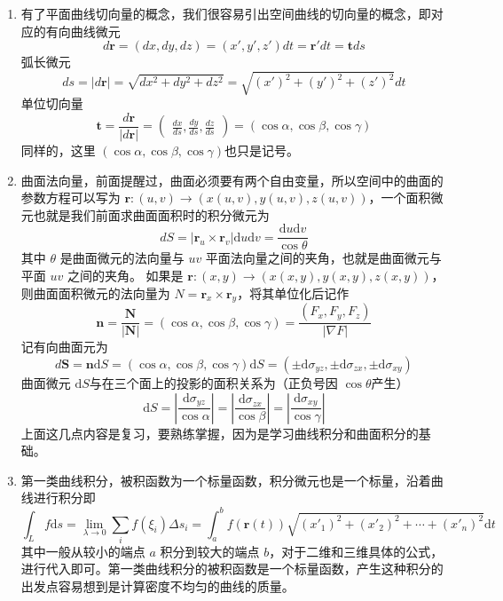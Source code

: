 \begin{enumerate}
    \item 有了平面曲线切向量的概念，我们很容易引出空间曲线的切向量的概念，即对应的有向曲线微元
    \[
        d\mathbf{r}=(dx,dy,dz)=(x',y',z')dt=\mathbf{r}'dt=\mathbf{t}ds
    \]
    弧长微元
    \[
        ds=|d\mathbf{r}|=\sqrt{dx^2+dy^2+dz^2}=\sqrt{(x')^2+(y')^2+(z')^2}dt
    \]
    单位切向量
    \[
    \mathbf{t}=\frac{d\mathbf{r}}{|d\mathbf{r}|}=\begin{pmatrix}\frac{dx}{ds},\frac{dy}{ds},\frac{dz}{ds}\end{pmatrix}=(\cos\alpha,\cos\beta,\cos\gamma)
    \]
    同样的，这里 $(\cos\alpha,\cos\beta,\cos\gamma)$也只是记号。

    \item 曲面法向量，前面提醒过，曲面必须要有两个自由变量，所以空间中的曲面的参数方程可以写为 $\mathbf{r}: (u,v) \to (x(u,v), y(u,v), z(u,v))$，一个面积微元也就是我们前面求曲面面积时的积分微元为
    \[
        dS=|\mathbf{r}_u\times \mathbf{r}_v| \mathrm{d}u \mathrm{d}v = \frac{\mathrm{d}u \mathrm{d}v}{\cos \theta}
    \]
    其中 $\theta$ 是曲面微元的法向量与 $uv$ 平面法向量之间的夹角，也就是曲面微元与平面 $uv$ 之间的夹角。
    如果是 $\mathbf{r}: (x,y) \to (x(x,y), y(x,y), z(x,y))$，则曲面面积微元的法向量为 $N=\mathbf{r}_x \times \mathbf{r}_y$，将其单位化后记作
    \[
        \mathbf{n} = \frac{\mathbf{N}}{|\mathbf{N}|}= (\cos \alpha, \cos \beta, \cos \gamma) = \frac{(F_x, F_y, F_z)}{|\nabla F|}
    \]
    记有向曲面元为
    \[
        d \mathbf{S} = \mathbf{n} \mathrm{d} S = (\cos \alpha, \cos \beta, \cos \gamma) \mathrm{d} S =(\pm \mathrm{d}\sigma_{yz}, \pm \mathrm{d}\sigma_{zx}, \pm \mathrm{d}\sigma_{xy})
    \]
    曲面微元 $\mathrm{d}S$与在三个面上的投影的面积关系为（正负号因 $\cos \theta $产生）
    \[
        \mathrm{d}S = \left|\frac{\mathrm{d} \sigma _{yz}}{\cos \alpha} \right| 
        = \left| \frac{\mathrm{d} \sigma_{zx}}{\cos \beta} \right|
        = \left| \frac{\mathrm{d} \sigma _{xy}}{\cos \gamma} \right|
    \]
    上面这几点内容是复习，要熟练掌握，因为是学习曲线积分和曲面积分的基础。

    \item 第一类曲线积分，被积函数为一个标量函数，积分微元也是一个标量，沿着曲线进行积分即
    \[
        \int _L f \mathrm{d} s = \lim_{\lambda\to0}\sum_if(\xi_i)\Delta s_i = \int _a^b f(\mathbf{r}(t)) \sqrt{(x'_1)^2+(x'_2)^2 + \cdots + (x'_n)^2} \mathrm{d}t
    \]
    其中一般从较小的端点 $a$ 积分到较大的端点 $b$，对于二维和三维具体的公式，进行代入即可。第一类曲线积分的被积函数是一个标量函数，产生这种积分的出发点容易想到是计算密度不均匀的曲线的质量。


\end{enumerate}
